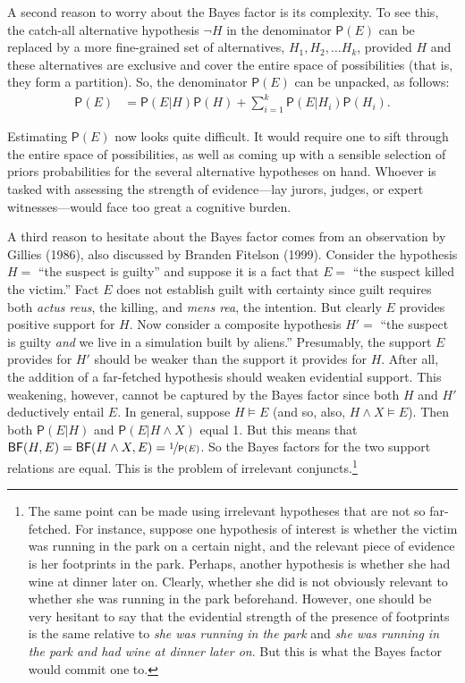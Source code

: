 \documentclass[
  10pt,
  dvipsnames,enabledeprecatedfontcommands]{scrartcl}
\newcommand{\et}{\wedge}
\newcommand{\pr}[1]{\mathsf{P}(#1)}
\begin{document}
A second reason to worry about the Bayes factor is its complexity. To
see this, the catch-all alternative hypothesis \(\neg H\) in the
denominator \(\pr{E}\) can be replaced by a more fine-grained set of
alternatives, \(H_1, H_2, \dots H_k\), provided \(H\) and these
alternatives are exclusive and cover the entire space of possibilities
(that is, they form a partition). So, the denominator \(\pr{E}\) can be
unpacked, as follows: \begin{align} \label{eq:lotpLong}
\pr{E} & = \pr{E\vert H}\pr{H} +\sum_{i=1}^k \pr{E\vert H_i}\pr{H_i}. 
\end{align}

\noindent Estimating \(\pr{E}\) now looks quite difficult. It would
require one to sift through the entire space of possibilities, as well
as coming up with a sensible selection of priors probabilities for the
several alternative hypotheses on hand. Whoever is tasked with assessing
the strength of evidence---lay jurors, judges, or expert
witnesses---would face too great a cognitive burden.

A third reason to hesitate about the Bayes factor comes from an
observation by Gillies (1986), also discussed by Branden Fitelson
(1999). Consider the hypothesis \(H =\) ``the suspect is guilty'' and
suppose it is a fact that \(E =\) ``the suspect killed the victim.''
Fact \(E\) does not establish guilt with certainty since guilt requires
both \emph{actus reus}, the killing, and \emph{mens rea}, the intention.
But clearly \(E\) provides positive support for \(H\). Now consider a
composite hypothesis \(H'=\) ``the suspect is guilty \textit{and} we
live in a simulation built by aliens.'' Presumably, the support \(E\)
provides for \(H'\) should be weaker than the support it provides for
\(H\). After all, the addition of a far-fetched hypothesis should weaken
evidential support. This weakening, however, cannot be captured by the
Bayes factor since both \(H\) and \(H'\) deductively entail \(E\). In
general, suppose \(H\models E\) (and so, also, \(H \et X \models E\)).
Then both \(\pr{E\vert H}\) and \(\pr{E \vert H \et X}\) equal 1. But
this means that
\(\mathsf{BF}(H,E) = \mathsf{BF}(H \et X, E) = \nicefrac{1}{\pr{E}}\).
So the Bayes factors for the two support relations are equal. This is
the problem of irrelevant conjuncts.\footnote{The same point can be made
  using irrelevant hypotheses that are not so far-fetched. For instance,
  suppose one hypothesis of interest is whether the victim was running
  in the park on a certain night, and the relevant piece of evidence is
  her footprints in the park. Perhaps, another hypothesis is whether she
  had wine at dinner later on. Clearly, whether she did is not obviously
  relevant to whether she was running in the park beforehand. However,
  one should be very hesitant to say that the evidential strength of the
  presence of footprints is the same relative to
  \emph{she was running in the park} and
  \emph{she was running in the park and had wine at dinner later on}.
  But this is what the Bayes factor would commit one to.}
\end{document}
